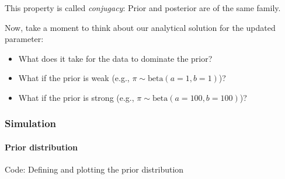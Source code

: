 \documentclass[
  11pt,
]{article}
\providecommand{\tightlist}{%
  \setlength{\itemsep}{0pt}\setlength{\parskip}{0pt}}
\begin{document}
This property is called \emph{conjugacy}: Prior and posterior are of the same
family.

Now, take a moment to think about our analytical solution for the
updated parameter:

\begin{itemize}
\tightlist
\item
  What does it take for the data to dominate the prior?
\item
  What if the prior is weak (e.g.,
  \(\pi \sim \text{beta}(a = 1,b = 1)\))?
\item
  What if the prior is strong (e.g.,
  \(\pi \sim \text{beta}(a = 100, b = 100)\))?
\end{itemize}

\hypertarget{simulation}{%
\subsubsection{Simulation}\label{simulation}}

\hypertarget{prior-distribution-1}{%
\paragraph{Prior distribution}\label{prior-distribution-1}}

Code: Defining and plotting the prior distribution
\end{document}
